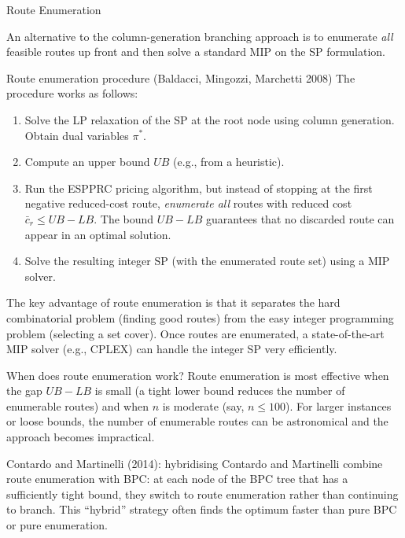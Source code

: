 \documentclass[aspectratio=169,10pt]{beamer}
\begin{document}
\begin{frame}[allowframebreaks]{Route Enumeration}

An alternative to the column-generation branching approach is to
enumerate \emph{all} feasible routes up front and then solve a standard
MIP on the SP formulation.

\begin{block}{Route enumeration procedure (Baldacci, Mingozzi, Marchetti 2008)}
The procedure works as follows:
\begin{enumerate}
  \item Solve the LP relaxation of the SP at the root node using column
        generation. Obtain dual variables $\pi^*$.
  \item Compute an upper bound $UB$ (e.g., from a heuristic).
  \item Run the ESPPRC pricing algorithm, but instead of stopping at
        the first negative reduced-cost route, \emph{enumerate all}
        routes with reduced cost $\bar{c}_r \leq UB - LB$. The bound
        $UB - LB$ guarantees that no discarded route can appear in an
        optimal solution.
  \item Solve the resulting integer SP (with the enumerated route set)
        using a MIP solver.
\end{enumerate}
\end{block}

\framebreak

The key advantage of route enumeration is that it separates the hard
combinatorial problem (finding good routes) from the easy integer
programming problem (selecting a set cover). Once routes are enumerated,
a state-of-the-art MIP solver (e.g., CPLEX) can handle the integer SP
very efficiently.

\begin{alertblock}{When does route enumeration work?}
Route enumeration is most effective when the gap $UB - LB$ is small
(a tight lower bound reduces the number of enumerable routes) and when
$n$ is moderate (say, $n \leq 100$). For larger instances or loose
bounds, the number of enumerable routes can be astronomical and
the approach becomes impractical.
\end{alertblock}

\begin{block}{Contardo and Martinelli (2014): hybridising}
Contardo and Martinelli combine route enumeration with BPC: at each
node of the BPC tree that has a sufficiently tight bound, they switch
to route enumeration rather than continuing to branch. This ``hybrid''
strategy often finds the optimum faster than pure BPC or pure
enumeration.
\end{block}

\end{frame}
\end{document}
